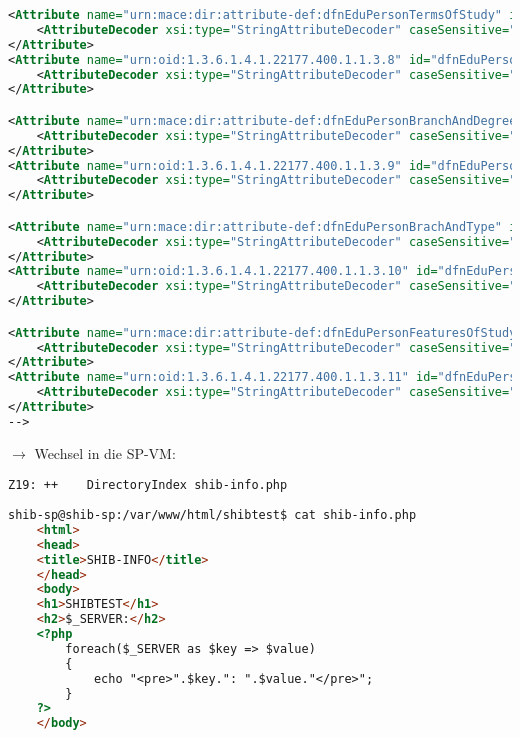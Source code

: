 \begin{lstlisting}[language=xml]
<Attribute name="urn:mace:dir:attribute-def:dfnEduPersonTermsOfStudy" id="dfnEduPersonTermsOfStudy">
	<AttributeDecoder xsi:type="StringAttributeDecoder" caseSensitive="false"/>
</Attribute>
<Attribute name="urn:oid:1.3.6.1.4.1.22177.400.1.1.3.8" id="dfnEduPersonTermsOfStudy">
	<AttributeDecoder xsi:type="StringAttributeDecoder" caseSensitive="false"/>
</Attribute>

<Attribute name="urn:mace:dir:attribute-def:dfnEduPersonBranchAndDegree" id="dfnEduPersonBranchAndDegree">
	<AttributeDecoder xsi:type="StringAttributeDecoder" caseSensitive="false"/>
</Attribute>
<Attribute name="urn:oid:1.3.6.1.4.1.22177.400.1.1.3.9" id="dfnEduPersonBranchAndDegree">
	<AttributeDecoder xsi:type="StringAttributeDecoder" caseSensitive="false"/>
</Attribute>

<Attribute name="urn:mace:dir:attribute-def:dfnEduPersonBrachAndType" id="dfnEduPersonBrachAndType">
	<AttributeDecoder xsi:type="StringAttributeDecoder" caseSensitive="false"/>
</Attribute>
<Attribute name="urn:oid:1.3.6.1.4.1.22177.400.1.1.3.10" id="dfnEduPersonBrachAndType">
	<AttributeDecoder xsi:type="StringAttributeDecoder" caseSensitive="false"/>
</Attribute>

<Attribute name="urn:mace:dir:attribute-def:dfnEduPersonFeaturesOfStudy" id="dfnEduPersonFeaturesOfStudy">
	<AttributeDecoder xsi:type="StringAttributeDecoder" caseSensitive="false"/>
</Attribute>
<Attribute name="urn:oid:1.3.6.1.4.1.22177.400.1.1.3.11" id="dfnEduPersonFeaturesOfStudy">
	<AttributeDecoder xsi:type="StringAttributeDecoder" caseSensitive="false"/>
</Attribute>
-->
\end{lstlisting}


$\rightarrow$ Wechsel in die SP-VM:
\begin{lstlisting}
Z19: ++    DirectoryIndex shib-info.php
\end{lstlisting}
\begin{lstlisting}[language=html]
shib-sp@shib-sp:/var/www/html/shibtest$ cat shib-info.php 
	<html>
	<head>
	<title>SHIB-INFO</title>
	</head>
	<body>
	<h1>SHIBTEST</h1>
	<h2>$_SERVER:</h2>
	<?php
		foreach($_SERVER as $key => $value)
		{
			echo "<pre>".$key.": ".$value."</pre>";
		}
	?>
	</body>
\end{lstlisting}

